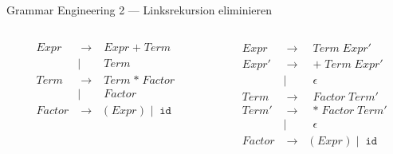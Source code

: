 \documentclass{beamer}
\begin{document}
\begin{frame}{Grammar Engineering 2 --- Linksrekursion eliminieren}
  \begin{columns}
    \begin{column}{0.5\textwidth}
      \begin{alignat*}{2}
        & Expr   & \; \to \; & Expr \; \texttt{+} \; Term \\
              && \mid \;\; & Term \\
        & Term   & \; \to \; & Term \; \texttt{*} \; Factor \\
                && \mid \;\; & Factor \\
        & Factor & \; \to \; & \texttt{(} \; Expr \; \texttt{)} \; \mid \; \texttt{id}
      \end{alignat*}

    \end{column}
    \begin{column}{0.5\textwidth}
      \begin{alignat*}{2}
        & Expr   & \; \to \; & \; Term \; Expr' \\
        & Expr'  & \; \to \; & \; \texttt{+} \; Term \; Expr' \\
                && \mid \;\; & \; \epsilon \\
        & Term   & \; \to \; & \; Factor \; Term' \\
        & Term'  & \; \to \; & \; \texttt{*} \; Factor \; Term' \\
                && \mid \;\; & \; \epsilon \\
        & Factor & \; \to \; & \texttt{(} \; Expr \; \texttt{)} \; \mid \; \texttt{id}
      \end{alignat*}
    \end{column}
  \end{columns}

  \vfill


\end{frame}
\end{document}
